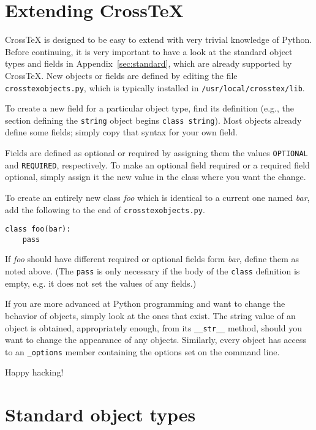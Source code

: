 \documentclass{article}
\newcommand{\XTX}{Cross\TeX}
\begin{document}
\section{Extending \XTX{}\label{sec:extending}}

\XTX{} is designed to be easy to extend with very trivial knowledge
of Python. Before continuing, it is very important to have a look at
the standard object types and fields in Appendix~\ref{sec:standard},
which are already supported by \XTX{}. New objects or fields are defined
by editing the file \texttt{crosstexobjects.py}, which is typically
installed in \texttt{/usr/local/crosstex/lib}.

To create a new field for a particular object type, find its definition
(e.g., the section defining the \texttt{string} object begins
\texttt{class string}). Most objects already define some fields;
simply copy that syntax for your own field.

Fields are defined as optional or required by assigning them the
values \texttt{OPTIONAL} and \texttt{REQUIRED}, respectively.  To make
an optional field required or a required field optional, simply assign
it the new value in the class where you want the change.

To create an entirely new class \textit{foo} which is identical to
a current one named \textit{bar}, add the following to the end of
\texttt{crosstexobjects.py}.

\begin{small}\begin{verbatim}
class foo(bar):
    pass
\end{verbatim}\end{small}

If \textit{foo} should have different required or optional fields form
\textit{bar}, define them as noted above. (The \texttt{pass} is only
necessary if the body of the \texttt{class} definition is empty, e.g. it
does not set the values of any fields.)

If you are more advanced at Python programming and want to change
the behavior of objects, simply look at the ones that exist. The
string value of an object is obtained, appropriately enough, from its
\texttt{\_\_str\_\_} method, should you want to change the appearance of
any objects. Similarly, every object has access to an \texttt{\_options}
member containing the options set on the command line.

Happy hacking!


\appendix
\section{Standard object types\label{sec:standard}}
\end{document}
